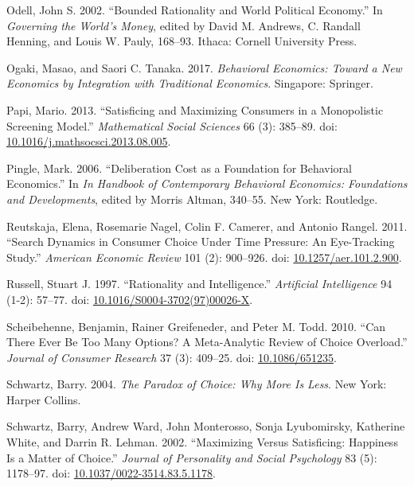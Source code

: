 \documentclass[
  10pt,
  letterpaper,
  DIV=11,
  numbers=noendperiod,
  twoside]{scrartcl}
\newlength{\cslhangindent}
\newenvironment{CSLReferences}[2] %
 {\begin{list}{}{%
  \setlength{\itemindent}{0pt}
  \setlength{\leftmargin}{0pt}
  \setlength{\parsep}{0pt}
  \ifodd #1
   \setlength{\leftmargin}{\cslhangindent}
   \setlength{\itemindent}{-1\cslhangindent}
  \fi
  \setlength{\itemsep}{#2\baselineskip}}}
 {\end{list}}
\begin{document}
\begin{CSLReferences}{1}{0}
Odell, John S. 2002. {``Bounded Rationality and World Political
Economy.''} In \emph{Governing the World's Money}, edited by David M.
Andrews, C. Randall Henning, and Louis W. Pauly, 168--93. Ithaca:
Cornell University Press.

Ogaki, Masao, and Saori C. Tanaka. 2017. \emph{Behavioral Economics:
Toward a New Economics by Integration with Traditional Economics}.
Singapore: Springer.

Papi, Mario. 2013. {``Satisficing and Maximizing Consumers in a
Monopolistic Screening Model.''} \emph{Mathematical Social Sciences} 66
(3): 385--89. doi:
\href{https://doi.org/10.1016/j.mathsocsci.2013.08.005}{10.1016/j.mathsocsci.2013.08.005}.

Pingle, Mark. 2006. {``Deliberation Cost as a Foundation for Behavioral
Economics.''} In \emph{In Handbook of Contemporary Behavioral Economics:
Foundations and Developments}, edited by Morris Altman, 340--55. New
York: Routledge.

Reutskaja, Elena, Rosemarie Nagel, Colin F. Camerer, and Antonio Rangel.
2011. {``Search Dynamics in Consumer Choice Under Time Pressure: An
Eye-Tracking Study.''} \emph{American Economic Review} 101 (2):
900--926. doi:
\href{https://doi.org/10.1257/aer.101.2.900}{10.1257/aer.101.2.900}.

Russell, Stuart J. 1997. {``Rationality and Intelligence.''}
\emph{Artificial Intelligence} 94 (1-2): 57--77. doi:
\href{https://doi.org/10.1016/S0004-3702(97)00026-X}{10.1016/S0004-3702(97)00026-X}.

Scheibehenne, Benjamin, Rainer Greifeneder, and Peter M. Todd. 2010.
{``Can There Ever Be Too Many Options? A Meta-Analytic Review of Choice
Overload.''} \emph{Journal of Consumer Research} 37 (3): 409--25. doi:
\href{https://doi.org/10.1086/651235}{10.1086/651235}.

Schwartz, Barry. 2004. \emph{The Paradox of Choice: Why More Is Less}.
New York: Harper Collins.

Schwartz, Barry, Andrew Ward, John Monterosso, Sonja Lyubomirsky,
Katherine White, and Darrin R. Lehman. 2002. {``Maximizing Versus
Satisficing: Happiness Is a Matter of Choice.''} \emph{Journal of
Personality and Social Psychology} 83 (5): 1178--97. doi:
\href{https://doi.org/10.1037/0022-3514.83.5.1178}{10.1037/0022-3514.83.5.1178}.


\end{CSLReferences}
\end{document}

